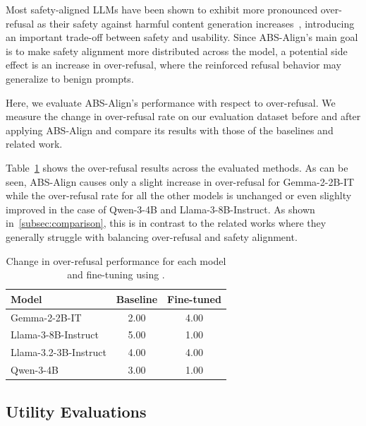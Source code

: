 Most safety-aligned LLMs have been shown to exhibit more pronounced over-refusal as their safety against harmful content generation increases~\cite{cui2025orbench}, introducing an important trade-off between safety and usability. Since ABS-Align's main goal is to make safety alignment more distributed across the model, a potential side effect is an increase in over-refusal, where the reinforced refusal behavior may generalize to benign prompts.

Here, we evaluate ABS-Align's performance with respect to over-refusal. We measure the change in over-refusal rate on our evaluation dataset before and after applying ABS-Align and compare its results with those of the baselines and related work.

Table~\ref{tab:xstest_overrefusal} shows the over-refusal results across the evaluated methods. As can be seen, ABS-Align causes only a slight increase in over-refusal for Gemma-2-2B-IT while the over-refusal rate for all the other models is unchanged or even slighlty improved in the case of Qwen-3-4B and Llama-3-8B-Instruct. As shown in~\ref{subsec:comparison}, this is in contrast to the related works where they generally struggle with balancing over-refusal and safety alignment.


\begin{table}[htbp]
    \centering
    \setlength{\tabcolsep}{2pt}
    \renewcommand{\arraystretch}{0.9}
    \small
    \caption{Change in over-refusal performance for each model and fine-tuning using \method.}
    \label{tab:xstest_overrefusal}
    


    \begin{tabular}{l cc}
        \toprule
        \textbf{Model} & \textbf{Baseline} & \textbf{Fine-tuned} \\
        \midrule
        Gemma-2-2B-IT & 2.00 & 4.00  \\
        Llama-3-8B-Instruct & 5.00 & 1.00   \\
        Llama-3.2-3B-Instruct & 4.00  & 4.00    \\
        Qwen-3-4B & 3.00 & 1.00  \\
        \bottomrule
    \end{tabular}
\end{table}





\subsection{Utility Evaluations}
\label{subsec:utility_eval}

